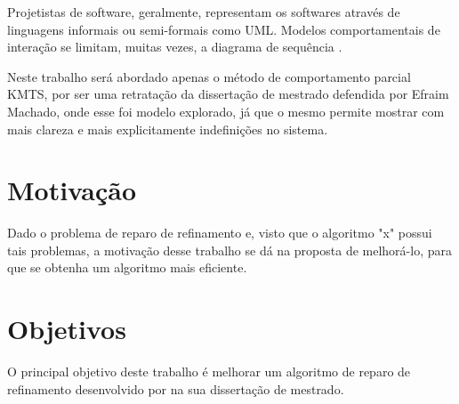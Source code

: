Projetistas de software, geralmente, representam os softwares através de linguagens informais ou semi-formais como UML. Modelos comportamentais de interação se limitam, muitas vezes, a diagrama de sequência \cite{uchitel2003synthesis}.


Neste trabalho será abordado apenas o método de comportamento parcial KMTS, por ser uma retratação da dissertação de mestrado defendida por Efraim Machado, onde esse foi modelo explorado, já que o mesmo permite mostrar com mais clareza e mais explicitamente indefinições no sistema.



\section{Motivação}

Dado o problema de reparo de refinamento e, visto que o algoritmo "x" possui tais problemas, a motivação desse trabalho se dá na proposta de melhorá-lo, para que se obtenha um algoritmo mais eficiente.



\section{Objetivos}

O principal objetivo deste trabalho é melhorar um algoritmo de reparo de refinamento desenvolvido por \cite{machado2017uso} na sua dissertação de mestrado.

